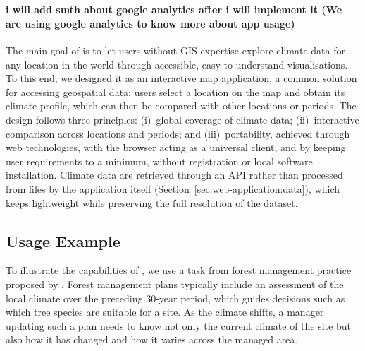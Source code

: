 \section{\webappname}\label{sec:web-application} %

\paragraph{i will add smth about google analytics after i will implement it (We are using google analytics to know more about app usage)}

The main goal of \webappname{} is to let users without GIS expertise explore climate
data for any location in the world through accessible, easy-to-understand
visualisations. To this end, we designed it as an interactive map application, a common
solution for accessing geospatial data: users select a location on the map and obtain
its climate profile, which can then be compared with other locations or periods. The
design follows three principles: (i)~global coverage of climate data; (ii)~interactive
comparison across locations and periods; and (iii)~portability, achieved through web
technologies, with the browser acting as a universal client, and by keeping user
requirements to a minimum, without registration or local software installation. Climate data are retrieved
through an API rather than processed from files by the application itself
(Section~\ref{sec:web-application:data}), which keeps \webappname{} lightweight while
preserving the full resolution of the dataset.


\subsection{Usage Example}\label{sec:web-application:usage-example}

To illustrate the capabilities of \webappname{}, we use a task from forest
management practice proposed by \climateexpert{}. Forest management plans
typically include an assessment of the local climate over the preceding 30-year
period, which guides decisions such as which tree species are suitable for a site.
As the climate shifts, a manager updating such a plan needs to know not only the
current climate of the site but also how it has changed and how it varies across
the managed area.

